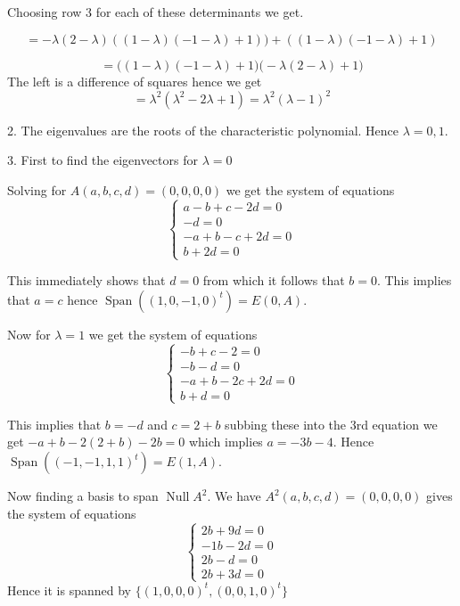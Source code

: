 \documentclass[letter,12pt]{article}
\newcommand{\Span}{\operatorname{Span}}
\newcommand{\Null}{\operatorname{Null}}
\begin{document}
Choosing row $3$ for each of these determinants we get. 

$$=-\lambda(2-\lambda)((1-\lambda)(-1-\lambda)+1))+((1-\lambda)(-1-\lambda)+1)$$

$$=\big((1-\lambda)(-1-\lambda)+1\big)\big(-\lambda (2-\lambda )+1\big)$$
The left is a difference of squares hence we get $$=\lambda^2(\lambda^2-2\lambda +1)=\lambda^2(\lambda-1)^2$$

2.
The eigenvalues are the roots of the characteristic polynomial. Hence $\lambda=0,1$. 

3. 
First to find the eigenvectors for $\lambda=0$

Solving for $A(a,b,c,d)=(0,0,0,0)$ we get the system of equations \begin{equation}
    \begin{cases}
        a-b+c-2d=0\\
        -d=0\\
        -a+b-c+2d=0\\
        b+2d=0
    \end{cases}
\end{equation}

This immediately shows that $d=0$ from which it follows that $b=0$. This implies that $a=c$ hence $\Span((1,0,-1,0)^t)=E(0,A)$. 

Now for $\lambda=1$ we get the system of equations \begin{equation}
    \begin{cases}
        -b+c-2=0\\-b-d=0\\-a+b-2c+2d=0\\b+d=0
    \end{cases}
\end{equation}

This implies that $b=-d$ and $c=2+b$ subbing these into the 3rd equation we get $-a+b-2(2+b)-2b=0$ which implies $a=-3b-4$. Hence $\Span((-1,-1,1,1)^t)=E(1,A)$.

Now finding a basis to span $\Null A^2$. We have $A^2(a,b,c,d)=(0,0,0,0)$
gives the system of equations \begin{equation}
    \begin{cases}
        2b+9d=0\\
        -1b-2d=0\\
        2b-d=0\\
        2b+3d=0
    \end{cases}
\end{equation}
Hence it is spanned by $\{(1,0,0,0)^t,(0,0,1,0)^t\}$
\end{document}
